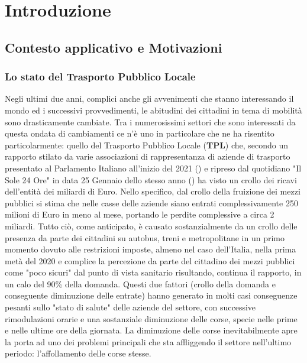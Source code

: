 \chapter{Introduzione}

\section{Contesto applicativo e Motivazioni} %
    \subsection{Lo stato del Trasporto Pubblico Locale}
    Negli ultimi due anni, complici anche gli avvenimenti che stanno interessando il mondo ed i successivi provvedimenti, le abitudini dei cittadini in tema di mobilità sono drasticamente cambiate.
    Tra i numerosissimi settori che sono interessati da questa ondata di cambiamenti ce n'è uno in particolare che ne ha risentito particolarmente: quello del Trasporto Pubblico Locale (\textbf{TPL}) che, secondo un rapporto stilato da varie associazioni di rappresentanza di aziende di trasporto presentato al Parlamento Italiano all'inizio del 2021 (\cite{statotpl}) e ripreso dal quotidiano "Il Sole 24 Ore" in data 25 Gennaio dello stesso anno (\cite{statotplsole24ore}) ha visto un crollo dei ricavi dell'entità dei miliardi di Euro. Nello specifico, dal crollo della fruizione dei mezzi pubblici si stima che nelle casse delle aziende siano entrati complessivamente 250 milioni di Euro in meno al mese, portando le perdite complessive a circa 2 miliardi.
    Tutto ciò, come anticipato, è causato sostanzialmente da un crollo delle presenza da parte dei cittadini su autobus, treni e metropolitane in un primo momento dovuto alle restrizioni imposte, almeno nel caso dell'Italia, nella prima metà del 2020 e complice la percezione da parte del cittadino dei mezzi pubblici come "poco sicuri" dal punto di vista sanitario risultando, continua il rapporto, in un calo del 90\% della domanda.
    Questi due fattori (crollo della domanda e conseguente diminuzione delle entrate) hanno generato in molti casi conseguenze pesanti sullo "stato di salute" delle aziende del settore, con successive rimodulazioni orarie e una sostanziale diminuzione delle corse, specie nelle prime e nelle ultime ore della giornata. La diminuzione delle corse inevitabilmente apre la porta ad uno dei problemi principali che sta affliggendo il settore nell'ultimo periodo: l'affollamento delle corse stesse.
    
